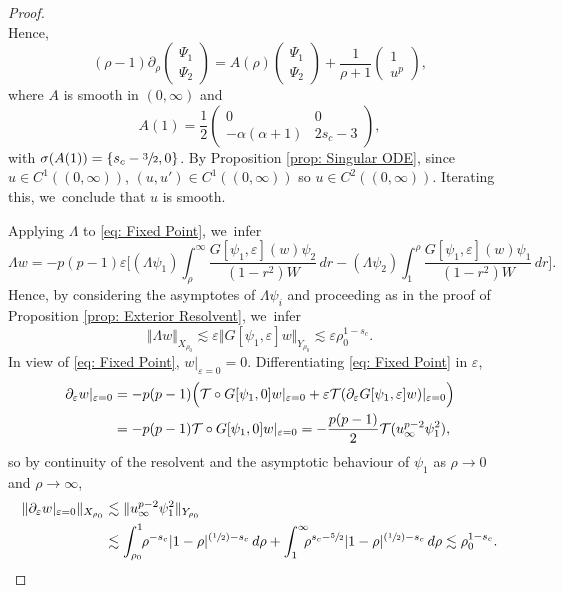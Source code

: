 \documentclass[10pt]{amsart}
\newcommand{\Psfrac}[2]{(\sfrac{#1}{#2})}
\theoremstyle{plain}
\theoremstyle{definition}
\begin{document}
\begin{proof}
\[\]
Hence,
\[
(\rho-1)\partial_\rho\begin{pmatrix} \Psi_1\\ \Psi_2\end{pmatrix} = A(\rho)\begin{pmatrix} \Psi_1\\ \Psi_2\end{pmatrix} +\frac{1}{\rho+1}\begin{pmatrix} 1\\u^p\end{pmatrix},
\]
where $A$ is smooth in $(0,\infty)$ and
\[
A(1)=\frac{1}{2}
\begin{pmatrix}
0 & 0\\
-\alpha(\alpha+1) & 2s_c-3
\end{pmatrix},
\]
with $\sigma(A(1))=\{s_c-\sfrac{3}{2},0\}$. By Proposition \ref{prop: Singular ODE}, since $u\in C^1((0,\infty))$, $(u,u')\in C^1((0,\infty))$ so $u\in C^2((0,\infty))$. Iterating this, we~conclude that $u$ is smooth.

Applying $\Lambda$ to \eqref{eq: Fixed Point}, we~infer
\[
\Lambda w=-p(p-1)\varepsilon \bigg[(\Lambda \psi_1)\int_{\rho}^\infty \frac{G[\psi_1,\varepsilon](w)\psi_2}{(1-r^2)W}\,dr-(\Lambda\psi_2)\int_1^\rho \frac{G[\psi_1,\varepsilon](w)\psi_1}{(1-r^2)W}\,dr\bigg].
\]
Hence, by considering the asymptotes of $\Lambda \psi_i$ and proceeding as in the proof of Proposition \ref{prop: Exterior Resolvent}, we~infer
\[
\Vert\Lambda w\Vert_{X_{\rho_0}}\lesssim \varepsilon \Vert G[\psi_1,\varepsilon]w\Vert_{Y_{\rho_0}}\lesssim \varepsilon \rho_0^{1-s_c}.
\]
In view of \eqref{eq: Fixed Point}, $w|_{\varepsilon=0}=0$. Differentiating \eqref{eq: Fixed Point} in $\varepsilon$,
\[
\begin{aligned}
\partial_{\varepsilon}w|_{\varepsilon=0}&=-p(p-1)\Bigl(\mathcal T\circ G[\psi_1,0]w|_{\varepsilon=0}+\varepsilon\mathcal T(\partial_{\varepsilon}G[\psi_1,\varepsilon]w)|_{\varepsilon=0}\Bigr)\\
&=-p(p-1) \mathcal T\circ G[\psi_1,0]w|_{\varepsilon=0}= -\frac{p(p-1)}{2}\mathcal T(u_\infty^{p-2}\psi_1^2),
\end{aligned}
\]
so by continuity of the resolvent and the asymptotic behaviour of $\psi_1$ as $\rho\to 0$ and $\rho\to\infty$,
\begin{align*}
\Vert \partial_{\varepsilon}w|_{\varepsilon=0}\Vert_{X_{\rho_0}}&\lesssim \Vert u_\infty^{p-2}\psi_1^2\Vert_{Y_{\rho_0}}\\
&\lesssim \int_{\rho_0}^1\hspace*{-1mm}\rho^{-s_c}|1-\rho|^{\Psfrac{1}{2}-s_c}\,d\rho+ \int_1^\infty\hspace*{-2mm}\rho^{s_c-\sfrac{5}{2}}|1-\rho|^{\Psfrac{1}{2}-s_c}\,d\rho\lesssim \rho_0^{1-s_c}.\qedhere
\end{align*}
\end{proof}
\end{document}
